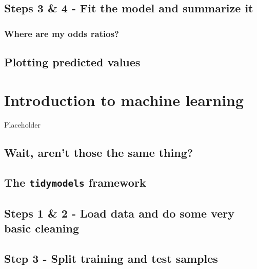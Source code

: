 \documentclass[
]{book}
\begin{document}
\hypertarget{steps-3-4---fit-the-model-and-summarize-it-1}{%
\section{Steps 3 \& 4 - Fit the model and summarize it}\label{steps-3-4---fit-the-model-and-summarize-it-1}}

\hypertarget{where-are-my-odds-ratios}{%
\subsection{Where are my odds ratios?}\label{where-are-my-odds-ratios}}

\hypertarget{plotting-predicted-values}{%
\section{Plotting predicted values}\label{plotting-predicted-values}}

\hypertarget{introduction-to-machine-learning}{%
\chapter{Introduction to machine learning}\label{introduction-to-machine-learning}}

Placeholder

\hypertarget{wait-arent-those-the-same-thing}{%
\section{Wait, aren't those the same thing?}\label{wait-arent-those-the-same-thing}}

\hypertarget{the-tidymodels-framework}{%
\section{\texorpdfstring{The \texttt{tidymodels} framework}{The tidymodels framework}}\label{the-tidymodels-framework}}

\hypertarget{steps-1-2---load-data-and-do-some-very-basic-cleaning}{%
\section{Steps 1 \& 2 - Load data and do some very basic cleaning}\label{steps-1-2---load-data-and-do-some-very-basic-cleaning}}

\hypertarget{step-3---split-training-and-test-samples}{%
\section{Step 3 - Split training and test samples}\label{step-3---split-training-and-test-samples}}
\end{document}
